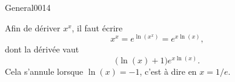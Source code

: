 \begin{corrige}{General0014}

Afin de dériver $x^x$, il faut écrire
\begin{equation}
	x^x= e^{\ln(x^x)}= e^{x\ln(x)},
\end{equation}
dont la dérivée vaut
\begin{equation}
	\big( \ln(x)+1 \big) e^{x\ln(x)}.
\end{equation}
Cela s'annule lorsque $\ln(x)=-1$, c'est à dire en $x=1/e$.

\end{corrige}
